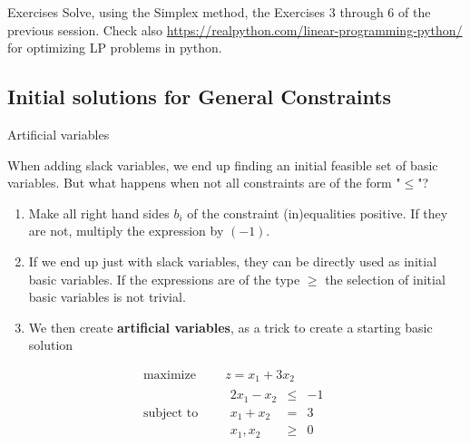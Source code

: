 \documentclass[c]{beamer}
\begin{document}
\begin{frame}{Exercises}
  Solve, using the Simplex method, the Exercises 3 through 6 of the previous session. Check also \href{different flavours}{https://realpython.com/linear-programming-python/} for optimizing LP problems in python.
\end{frame}

\subsection{Initial solutions for General Constraints}

\begin{frame}{Artificial variables}

  When adding slack variables, we end up finding an initial feasible set of basic variables. But what happens when not all constraints are of the form "$\leq$"?\cite{carter}

  \begin{enumerate}
    \item Make all right hand sides $b_i$ of the constraint (in)equalities positive. If they are not, multiply the expression by $(-1)$.
    \item If we end up just with slack variables, they can be directly used as initial basic variables. If the expressions are of the type $\geq$ the selection of initial basic variables is not trivial.
    \item We then create {\bf artificial variables}, as a trick to create a starting basic solution
  \end{enumerate}
  \begin{equation*}
    \begin{aligned}
      \text{maximize } \quad & z = x_1+3x_2 \\
      \text{subject to }\quad &
      \begin{array}{rcl}
        2x_1 -x_2 &\leq &-1 \\
        x_1+x_2 &= &3 \\
        x_1,x_2 &\geq& 0
      \end{array}
    \end{aligned}
  \end{equation*}
\end{frame}
\end{document}
